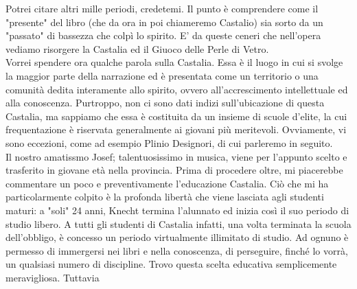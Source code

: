 \documentclass[12pt,a4paper]{report}
\theoremstyle{definition}
\theoremstyle{Theorem}
\theoremstyle{definition}
\theoremstyle{definition}
\theoremstyle{definition}
\begin{document}
Potrei citare altri mille periodi, credetemi. Il punto è comprendere come il "presente" del libro (che da ora in poi chiameremo Castalio) sia sorto da un "passato" di bassezza che colpì lo spirito. E' da queste ceneri che nell'opera vediamo risorgere la Castalia ed il Giuoco delle Perle di Vetro. \\
Vorrei spendere ora qualche parola sulla Castalia. Essa è il luogo in cui si svolge la maggior parte della narrazione ed è presentata come un territorio o una comunità dedita interamente allo spirito, ovvero all'accrescimento intellettuale ed alla conoscenza. Purtroppo, non ci sono dati indizi sull'ubicazione di questa Castalia, ma sappiamo che essa è costituita da un insieme di scuole d'elite, la cui frequentazione è riservata generalmente ai giovani più meritevoli. Ovviamente, vi sono eccezioni, come ad esempio Plinio Designori, di cui parleremo in seguito.\\
Il nostro amatissmo Josef; talentuosissimo in musica, viene per l'appunto scelto e trasferito in giovane età nella provincia. Prima di procedere oltre, mi piacerebbe commentare un poco e preventivamente l'educazione Castalia. Ciò che mi ha particolarmente colpito è la profonda libertà che viene lasciata agli studenti maturi: a "soli" 24 anni, Knecht termina l'alunnato ed inizia così il suo periodo di studio libero. A tutti gli studenti di Castalia infatti, una volta terminata la scuola dell'obbligo, è concesso un periodo virtualmente illimitato di studio. Ad ognuno è permesso di immergersi nei libri e nella conoscenza, di perseguire, finché lo vorrà, un qualsiasi numero di discipline. Trovo questa scelta educativa semplicemente meravigliosa. Tuttavia  
\end{document}
